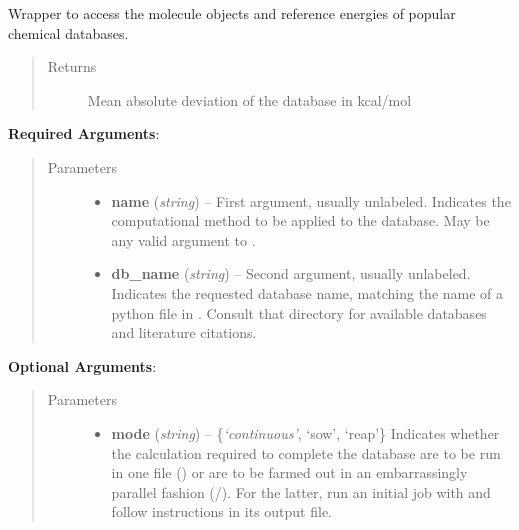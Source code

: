\documentclass[letterpaper,10pt,english]{sphinxmanual}
\begin{document}
\begin{fulllineitems}
\label{index:wrappers2.database}
Wrapper to access the molecule objects and reference energies of
popular chemical databases.
\begin{quote}\begin{description}
\item[{Returns}] \leavevmode
Mean absolute deviation of the database in kcal/mol

\end{description}\end{quote}

\textbf{Required Arguments}:
\begin{quote}\begin{description}
\item[{Parameters}] \leavevmode\begin{itemize}
\item {} 
\textbf{name} (\emph{string}) -- First argument, usually unlabeled.
Indicates the computational method to be applied to the database.
May be any valid argument to .

\item {} 
\textbf{db\_name} (\emph{string}) -- Second argument, usually unlabeled.
Indicates the requested database name, matching the name of a python
file in . Consult that directory for available
databases and literature citations.

\end{itemize}

\end{description}\end{quote}

\textbf{Optional Arguments}:
\begin{quote}\begin{description}
\item[{Parameters}] \leavevmode\begin{itemize}
\item {} 
\textbf{mode} (\emph{string}) -- \{\emph{`continuous'}, `sow', `reap'\}
Indicates whether the calculation required to complete the
database are to be run in one file () or are to be
farmed out in an embarrassingly parallel fashion
(/).  For the latter, run an initial job with
 and follow instructions in its output file.


\end{itemize}
\end{description}
\end{quote}
\end{fulllineitems}
\end{document}
